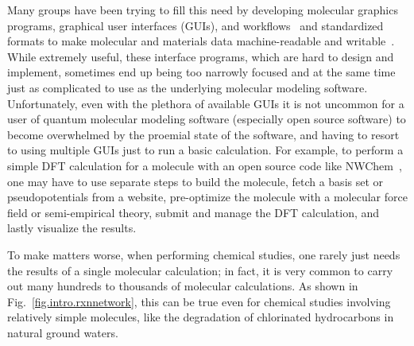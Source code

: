 \documentclass[runningheads,a4paper]{llncs}
\begin{document}
Many groups have been trying to fill this need by developing molecular graphics programs, graphical user interfaces (GUIs), and workflows~\cite{johnson1965ortep,wasikowski1993xmol,Unichem,michalewicz1995combining,baldridge1995qmview,smith1995molview,humphrey1996vmd,bode1998macmolplt,kokalj1999xcrysden,frisch2000gaussview,schaftenaar2000molden,portmann2000molekel,gans2001qmol,bahn2002object,schuchardt2002ecce,kokalj2003computer,gdanitz2005registering,verstraelen2008zeobuilder,thomas2010ccp1,hanson2010jmol,momma2011vesta,hanson2013jsmol,hanwell2021open,larsen2017atomic,nguyen2018nglview,smidstrup2019quantumatk,gilbert2019introduction,bienfait2013jsme,chen2012construction} and standardized formats to make molecular and materials data machine-readable and writable~\cite{murray2011cml,murray2011semantics,de2013data}. While extremely useful, these interface programs, which are hard to design and implement, sometimes end up being too narrowly focused and at the same time just as complicated to use as the underlying molecular modeling software.  Unfortunately, even with the plethora of available GUIs it is not uncommon for a user of quantum molecular modeling software (especially open source software) to become overwhelmed by the proemial state of the software, and having to resort to using multiple GUIs just to run a basic calculation. For example, to perform a simple DFT calculation for a molecule with an open source code like NWChem~\cite{kendall2000high,valiev2010nwchem,apra2020nwchem,kowalski2021nwchem}, one may have to use separate steps to build the molecule, fetch a basis set or pseudopotentials from a website, pre-optimize the molecule with a molecular force field or semi-empirical theory, submit and manage the DFT calculation, and lastly visualize the results.  

To make matters worse, when performing chemical studies, one rarely just needs the results of a single molecular calculation; in fact, it is very common to carry out many hundreds to thousands of molecular calculations.  As shown in Fig.~\ref{fig.intro.rxnnetwork}, this can be true even for chemical studies involving relatively simple molecules, like the degradation of chlorinated hydrocarbons in natural ground waters.
\end{document}
